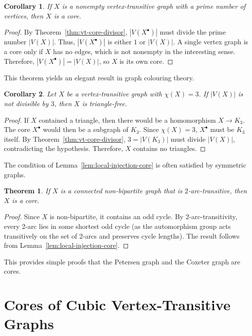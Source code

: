 \documentclass[12pt,a4paper,openany]{book}
\newtheorem{theorem}{Theorem}[section]
\newtheorem{corollary}{Corollary}[section]
\begin{document}
\begin{corollary}\label{cor:prime-core}
If $X$ is a nonempty vertex-transitive graph with a prime number of vertices, then $X$ is a core.
\end{corollary}
\begin{proof}
By Theorem~\ref{thm:vt-core-divisor}, $|V(X^\bullet)|$ must divide the prime number $|V(X)|$. Thus, $|V(X^\bullet)|$ is either $1$ or $|V(X)|$. A single vertex graph is a core only if $X$ has no edges, which is not nonempty in the interesting sense. Therefore, $|V(X^\bullet)| = |V(X)|$, so $X$ is its own core.
\end{proof}

This theorem yields an elegant result in graph colouring theory.

\begin{corollary}\label{cor:coloring-divisibility}
Let $X$ be a vertex-transitive graph with $\chi(X) = 3$. If $|V(X)|$ is not divisible by $3$, then $X$ is triangle-free.
\end{corollary}
\begin{proof}
If $X$ contained a triangle, then there would be a homomorphism $X \to K_3$. The core $X^\bullet$ would then be a subgraph of $K_3$. Since $\chi(X)=3$, $X^\bullet$ must be $K_3$ itself. By Theorem~\ref{thm:vt-core-divisor}, $3 = |V(K_3)|$ must divide $|V(X)|$, contradicting the hypothesis. Therefore, $X$ contains no triangles.
\end{proof}

The condition of Lemma~\ref{lem:local-injection-core} is often satisfied by symmetric graphs.

\begin{theorem}\label{thm:2arc-transitive-core}
If $X$ is a connected non-bipartite graph that is $2$-arc-transitive, then $X$ is a core.
\end{theorem}
\begin{proof}
Since $X$ is non-bipartite, it contains an odd cycle. By $2$-arc-transitivity, every 2-arc lies in some shortest odd cycle (as the automorphism group acts transitively on the set of 2-arcs and preserves cycle lengths). The result follows from Lemma~\ref{lem:local-injection-core}.
\end{proof}

This provides simple proofs that the Petersen graph and the Coxeter graph are cores.

\section{Cores of Cubic Vertex-Transitive Graphs}
\end{document}
